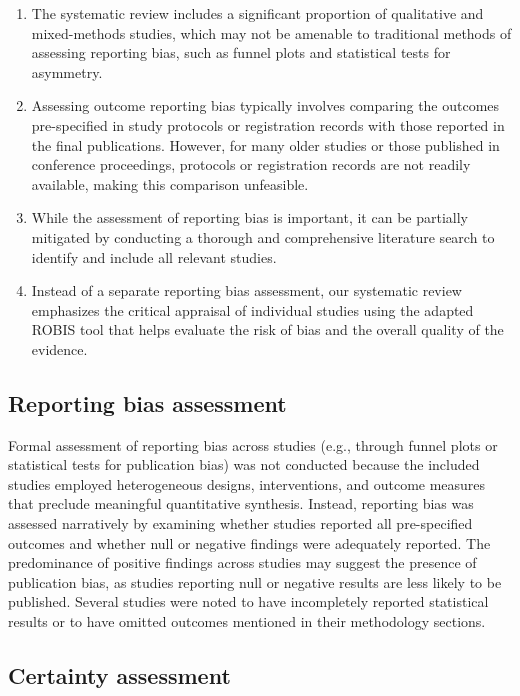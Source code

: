 \documentclass[a4paper,fleqn]{cas-sc}
\begin{document}
\begin{enumerate}[noitemsep]
 \item 
The systematic review includes a significant proportion of qualitative and mixed-methods studies, which may not be amenable to traditional methods of assessing reporting bias, such as funnel plots and statistical tests for asymmetry.

 \item 
Assessing outcome reporting bias typically involves comparing the outcomes pre-specified in study protocols or registration records with those reported in the final publications. However, for many older studies or those published in conference proceedings, protocols or registration records are not readily available, making this comparison unfeasible.

 \item 
While the assessment of reporting bias is important, it can be partially mitigated by conducting a thorough and comprehensive literature search to identify and include all relevant studies.

 \item 
Instead of a separate reporting bias assessment, our systematic review emphasizes the critical appraisal of individual studies using the adapted ROBIS tool that helps evaluate the risk of bias and the overall quality of the evidence.
\end{enumerate}

\subsection{Reporting bias assessment}

Formal assessment of reporting bias across studies (e.g., through funnel plots or statistical tests for publication bias) was not conducted because the included studies employed heterogeneous designs, interventions, and outcome measures that preclude meaningful quantitative synthesis. Instead, reporting bias was assessed narratively by examining whether studies reported all pre-specified outcomes and whether null or negative findings were adequately reported. The predominance of positive findings across studies may suggest the presence of publication bias, as studies reporting null or negative results are less likely to be published. Several studies were noted to have incompletely reported statistical results or to have omitted outcomes mentioned in their methodology sections.

\subsection{Certainty assessment}
\end{document}
